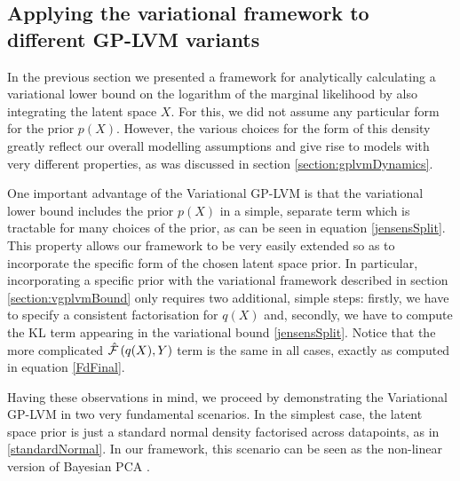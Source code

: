 \subsection{\label{section:priors} Applying the variational framework to different GP-LVM variants}
In the previous section we presented a framework for
analytically calculating a variational lower bound on
the logarithm of the marginal likelihood by also
integrating the latent space $X$. For this, we did
not assume any particular form for the prior $p(X)$.
However, the various choices for the form of this density greatly
reflect our overall modelling assumptions and give rise to
models with very different properties, as was discussed in section \ref{section:gplvmDynamics}.

One important advantage of the Variational GP-LVM is that
the variational lower bound includes the prior $p(X)$ in a
simple, separate term which is tractable for many choices of
the prior, as can be seen in equation \eqref{jensensSplit}.
This property allows our framework to be very easily extended
so as to incorporate the specific form of the chosen
latent space prior. 
%
In particular, incorporating a specific prior with the
variational framework described in section \ref{section:vgplvmBound}
only requires two additional, simple steps:
firstly, we have to specify a consistent factorisation for $q(X)$
and, secondly, we have to compute the KL term appearing
in the variational bound \eqref{jensensSplit}.
Notice that the more complicated $\hat{\mathcal{F}} \left( q(X), Y \right)$ term is the same
in all cases, exactly as computed in equation \eqref{FdFinal}.

Having these observations in mind, we proceed by demonstrating
the Variational GP-LVM in two very fundamental scenarios.
In the simplest case, the latent space prior is just a standard
normal density factorised across datapoints, as in \eqref{standardNormal}.
In our framework, this scenario can be seen as the non-linear
version of Bayesian PCA \cite{}. 

